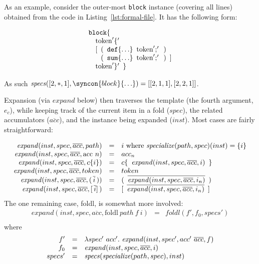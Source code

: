 \documentclass{kththesis}
\begin{document}
As an example, consider the outer-most \texttt{block} instance (covering all lines) obtained from the code in Listing~\ref{lst:formal-file}. It has the following form:

$$
\begin{array}{l}
\text{\texttt{block}}\{ \\
\quad \text{token}'\{' \\
\quad \text{[} \enspace \text{(} \enspace \text{\texttt{def}}\{\ldots\} \enspace \text{token}';' \enspace \text{)} \\
\quad \hphantom{\text{[}} \enspace \text{(} \enspace \text{\texttt{sum}}\{\ldots\} \enspace \text{token}';' \enspace \text{)} \enspace \text{]} \\
\quad \text{token}'\}' \enspace \} \\
\end{array}
$$

As such $\specs([2, *, 1], \syncon{block}\{\ldots\}) = [[2, 1, 1], [2, 2, 1]]$.

\newcommand{\expand}{\ensuremath{\mathit{expand}}}

Expansion (via $\expand$ below) then traverses the template (the fourth argument, $e_c$), while keeping track of the current item in a fold ($spec$), the related accumulators ($\overline{acc}$), and the instance being expanded ($inst$). Most cases are fairly straightforward:

$$
\begin{array}{rcl}
\expand(inst, spec, \overline{acc}, path) & = & i \text{ where } \specialize(path, spec)(inst) = \{i\} \\
\expand(inst, spec, \overline{acc}, \text{acc}~n) & = & acc_n \\
\expand(inst, spec, \overline{acc}, c\{i\}) & = & c\{\enspace \expand(inst, spec, \overline{acc}, i) \enspace \} \\
\expand(inst, spec, \overline{acc}, token) & = & token \\
\expand(inst, spec, \overline{acc}, (\, \overline{i} \,)) & = & (\enspace \overline{\expand(inst, spec, \overline{acc}, i_n)} \enspace) \\
\expand(inst, spec, \overline{acc}, [\, \overline{i}] \,) & = & [\enspace \overline{\expand(inst, spec, \overline{acc}, i_n)} \enspace] \\
\end{array}
$$
The one remaining case, foldl, is somewhat more involved:
$$
\begin{array}{rcl}
\expand(inst, spec, \overline{acc}, \text{foldl}~path~f~i) & = & \mathit{foldl}(f', f_0, specs') \\
\end{array}
$$
where
$$
\begin{array}{rcl}
f' & = & \lambda spec'~acc'.~ \expand(inst, spec', acc'~\overline{acc}, f) \\
f_0 & = & \expand(inst, spec, \overline{acc}, i) \\
specs' & = & \specs(\specialize(path, spec), inst) \\
\end{array}
$$
\end{document}
